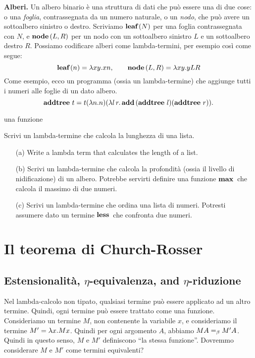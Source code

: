 \documentclass{article}
\begin{document}
{\bf Alberi.} Un albero binario \`e una struttura di dati che pu\`o essere una
di due cose: o una {\em foglia}, contrassegnata da un numero naturale, o un {\em
	nodo}, che pu\`o avere un sottoalbero sinistro o destro. Scriviamo $\mathop{\textbf{\bf leaf}\,}(N)$
per una foglia contrassegnata con $N$, e $\mathop{\textbf{\bf node}\,}(L,R)$ per un nodo con un
sottoalbero sinistro $L$ e un sottoalbero destro $R$. Possiamo codificare
alberi come lambda-termini, per esempio cos\`i come segue:
\[ \mathop{\textbf{\bf leaf}\,}(n) = \lambda xy.xn,\hspace{2em} \mathop{\textbf{\bf node}\,}(L,R) = \lambda xy.yLR \]
Come esempio, ecco un programma (ossia un lambda-termine) che aggiunge
tutti i numeri alle foglie di un dato albero.
\[ \mathop{\textbf{\bf addtree}\,} t = t(\lambda n.n)(\lambda l\,
r.\mathop{\textbf{\bf add}\,}(\mathop{\textbf{\bf addtree}\,}l)(\mathop{\textbf{\bf addtree}\,}r)).
\]

una funzione
\begin{exercise}
  Scrivi un lambda-termine che calcola la lunghezza di una lista.
  \begin{enumerate}
  \item[(a)] Write a lambda term that calculates the length of a
    list.
  \item[(b)] Scrivi un lambda-termine che calcola la profondit\`a (ossia il
  livello di nidificazione) di un albero. Potrebbe servirti definire una
    funzione $\mathop{\textbf{\bf max}\,}$ che calcola il massimo di due numeri.
  \item[(c)] Scrivi un lambda-termine che ordina una lista di numeri. Potresti
  assumere dato un termine $\mathop{\textbf{\bf less}\,}$ che confronta due numeri.
  \end{enumerate}
\end{exercise}

\section{Il teorema di Church-Rosser}

\subsection{Estensionalit\`a, $\eta$-equivalenza, and $\eta$-riduzione}

Nel lambda-calcolo non tipato, qualsiasi termine pu\`o essere applicato
ad un altro termine. Quindi, ogni termine pu\`o essere trattato come una funzione.
Consideriamo un termine $M$, non contenente la variabile $x$, e consideriamo
il termine $M'=\lambda x.Mx$. Quindi per ogni argomento $A$, abbiamo $MA=_{\beta} M'A$.
Quindi in questo senso, $M$ e $M'$ definiscono ``la stessa funzione''.  
Dovremmo considerare $M$ e $M'$ come termini equivalenti?
\end{document}
